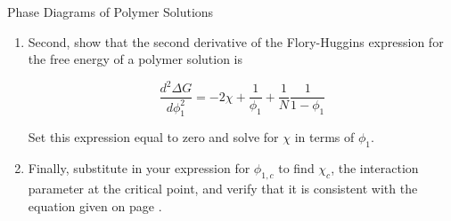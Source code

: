 \begin{activity}{Phase Diagrams of Polymer Solutions}
\begin{exercises}
\begin{enumerate}
		
			\item Second, show that the second derivative of the Flory-Huggins expression for the free energy of a polymer solution is
	
				\begin{equation*}
					\frac{d^2\Delta G}{d\phi_1^2} = -2\chi + \frac{1}{\phi_1} + \frac{1}{N}\frac{1}{1-\phi_1}
				\end{equation*}
		
				Set this expression equal to zero and solve for $\chi$ in terms of $\phi_1$.
			
				\begin{solution}\end{solution}
				
				
			\item Finally, substitute in your expression for $\phi_{1,c}$ to find $\chi_c$, the interaction parameter at the critical point, and verify that it is consistent with the equation given on page \pageref{\labelbase:infobox:critpt}.
			
				\begin{solution}\end{solution}
				

\end{enumerate}
\end{exercises}
\end{activity}
